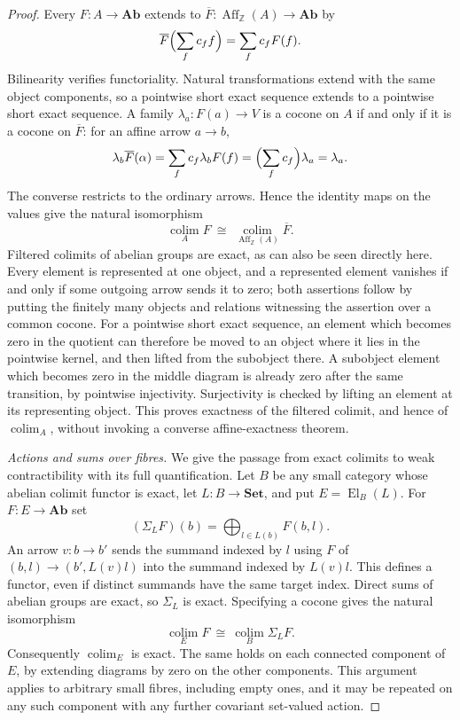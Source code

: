 \documentclass[11pt,a4paper]{article}
\theoremstyle{definition}
\theoremstyle{remark}
\newcommand{\Set}{\mathbf{Set}}
\newcommand{\Ab}{\mathbf{Ab}}
\newcommand{\Z}{\mathbb Z}
\newcommand{\El}{\operatorname{El}}
\newcommand{\colim}{\operatorname*{colim}}
\newcommand{\Aff}{\operatorname{Aff}}
\begin{document}
\begin{proof}
Every $F:A\to\Ab$ extends to
$\overline F:\Aff_{\Z}(A)\to\Ab$ by
\[
 \overline F\Bigl(\sum_f c_ff\Bigr)=\sum_fc_fF(f).
\]
Bilinearity verifies functoriality.  Natural transformations
extend with the same object components, so a pointwise short
exact sequence extends to a pointwise short exact sequence.
A family $\lambda_a:F(a)\to V$ is a cocone on $A$ if and only
if it is a cocone on $\overline F$: for an affine arrow $a\to b$,
\[
 \lambda_b\overline F(\alpha)
   =\sum_f c_f\lambda_bF(f)
   =\Bigl(\sum_f c_f\Bigr)\lambda_a=\lambda_a.
\]
The converse restricts to the ordinary arrows.  Hence the
identity maps on the values give the natural isomorphism
\[
 \colim_A F\ \cong\ \colim_{\Aff_{\Z}(A)}\overline F.
\]
Filtered colimits of abelian groups are exact, as can also be
seen directly here.  Every element is represented at one object,
and a represented element vanishes if and only if some outgoing
arrow sends it to zero; both assertions follow by putting the
finitely many objects and relations witnessing the assertion
over a common cocone.  For a pointwise short exact sequence,
an element which becomes zero in the quotient can therefore be
moved to an object where it lies in the pointwise kernel, and
then lifted from the subobject there.  A subobject element which
becomes zero in the middle diagram is already zero after the
same transition, by pointwise injectivity.  Surjectivity is
checked by lifting an element at its representing object.
This proves exactness of the filtered colimit, and hence of
$\colim_A$, without invoking a converse affine-exactness theorem.

\emph{Actions and sums over fibres.}
We give the passage from exact colimits to weak contractibility
with its full quantification.  Let $B$ be any small category
whose abelian colimit functor is exact, let $L:B\to\Set$, and
put $E=\El_B(L)$.  For $F:E\to\Ab$ set
\[
 (\Sigma_LF)(b)=\bigoplus_{l\in L(b)}F(b,l).
\]
An arrow $v:b\to b'$ sends the summand indexed by $l$ using
$F$ of $(b,l)\to(b',L(v)l)$ into the summand indexed by $L(v)l$.
This defines a functor, even if distinct summands have the same
target index.  Direct sums of abelian groups are exact, so
$\Sigma_L$ is exact.  Specifying a cocone gives the natural
isomorphism
\[
 \colim_E F\ \cong\ \colim_B\Sigma_LF.
\]
Consequently $\colim_E$ is exact.  The same holds on each
connected component of $E$, by extending diagrams by zero on
the other components.  This argument applies to arbitrary
small fibres, including empty ones, and it may be repeated on
any such component with any further covariant set-valued action.


\end{proof}
\end{document}
